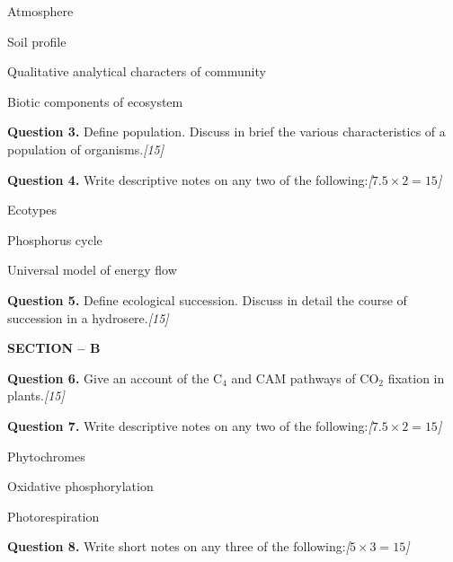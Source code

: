 \documentclass[11pt,a4paper]{article}
\newcommand{\pts}[1]{\hfill   \textit{[#1]}}
\begin{document}
\begin{parts}
  \item Atmosphere
  \item Soil profile
  \item Qualitative analytical characters of community
  \item Biotic components of ecosystem
\end{parts}

\medskip


\noindent   \textbf{Question 3.} Define population. Discuss in brief the various characteristics of a population of organisms.\pts{15}

\medskip


\noindent   \textbf{Question 4.} Write descriptive notes on any two of the following:\pts{$7.5  \times 2 = 15$}

\begin{parts}
  \item Ecotypes
  \item Phosphorus cycle
  \item Universal model of energy flow
\end{parts}

\medskip


\noindent   \textbf{Question 5.} Define ecological succession. Discuss in detail the course of succession in a hydrosere.\pts{15}

\bigskip

\begin{center}
   \textbf{SECTION -- B}
\end{center}

\medskip


\noindent   \textbf{Question 6.} Give an account of the $ \text{C}_4$ and CAM pathways of $ \text{CO}_2$ fixation in plants.\pts{15}

\medskip


\noindent   \textbf{Question 7.} Write descriptive notes on any two of the following:\pts{$7.5  \times 2 = 15$}

\begin{parts}
  \item Phytochromes
  \item Oxidative phosphorylation
  \item Photorespiration
\end{parts}

\medskip


\noindent   \textbf{Question 8.} Write short notes on any three of the following:\pts{$5  \times 3 = 15$}
\end{document}
